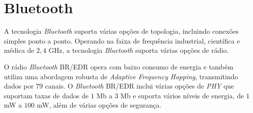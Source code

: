 \section{Bluetooth}
\label{sec:bluetooth}
A  tecnologia \emph{Bluetooth}  suporta várias opções de topologia, incluindo conexões simples ponto a ponto. Operando na faixa de frequência industrial, científica e médica de $2,4$ GHz, a tecnologia \emph{Bluetooth} suporta várias opções de rádio.

O rádio \emph{Bluetooth} BR/EDR opera com baixo consumo de energia e também utiliza uma abordagem robusta de \textit{Adaptive Frequency Hopping}, transmitindo dados por $79$ canais. O \textit{Bluetooth} BR/EDR inclui várias opções de \textit{PHY} que suportam taxas de dados de $1$ Mb a $3$ Mb e suporta vários níveis de energia, de $1$mW a $100$ mW, além de várias opções de segurança.

